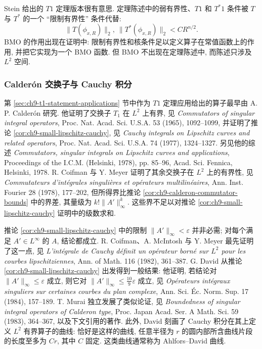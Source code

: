 \hypertarget{chapter-09-page-225}{}

Stein  给出的 $T1$ 定理版本很有意思. 定理陈述中的弱有界性、$T1$ 和 $T^*1$ 条件被 $T$ 与 $T^*$ 的一个 ``限制有界性'' 条件代替:
\[
 \|T(\phi_{x,R})\|_2,\ \|T^*(\phi_{x,R})\|_2<CR^{n/2}.
\]
BMO 的作用出现在证明中: 限制有界性和核条件足以定义算子在常值函数上的作用, 并把它实现为一个 BMO 函数. 但 BMO 不出现在定理陈述中, 而陈述只涉及 $L^2$ 空间.

\subsubsection{Calderón 交换子与 Cauchy 积分}
\label{subsec:ch9-calderon-cauchy}

第 \ref{sec:ch9-t1-statement-applications} 节中作为 $T1$ 定理应用给出的算子最早由 A. P. Calderón 研究. 他证明了交换子 $T_1$ 在 $L^2$ 上有界, 见 
\emph{Commutators of singular integral operators}, Proc. Nat. Acad. Sci. U.S.A. 53 (1965), 1092--1099, 并证明了推论 \ref{cor:ch9-small-lipschitz-cauchy}, 见 
\emph{Cauchy integrals on Lipschitz curves and related operators}, Proc. Nat. Acad. Sci. U.S.A. 74 (1977), 1324--1327. 另见他的综述 
\emph{Commutators, singular integrals on Lipschitz curves and applications}, Proceedings of the I.C.M. (Helsinki, 1978), pp. 85--96, Acad. Sci. Fennica, Helsinki, 1978. R. Coifman 与 Y. Meyer 证明了其余交换子在 $L^2$ 上的有界性, 见 
\emph{Commutateurs d'intégrales singulières et opérateurs multilinéaires}, Ann. Inst. Fourier 28 (1978), 177--202, 但所得界比推论 \ref{cor:ch9-calderon-commutator-bounds} 中的界差, 其量级为 $k!\|A'\|_\infty^k$. 这些界不足以对推论 \ref{cor:ch9-small-lipschitz-cauchy} 证明中的级数求和.

推论 \ref{cor:ch9-small-lipschitz-cauchy} 中的限制 $\|A'\|_\infty<\varepsilon$ 并非必需; 对每个满足 $A'\in L^\infty$ 的 $A$, 结论都成立. R. Coifman、A. McIntosh 与 Y. Meyer 最先证明了这一点, 见 
\emph{L'intégrale de Cauchy définit un opérateur borné sur $L^2$ pour les courbes lipschitziennes}, Ann. of Math. 116 (1982), 361--387. G. David 从推论 \ref{cor:ch9-small-lipschitz-cauchy} 出发得到一般结果: 他证明, 若结论对 $\|A'\|_\infty\leq\varepsilon$ 成立, 则它对 $\|A'\|_\infty\leq\frac{10}{9}\varepsilon$ 成立, 见 
\emph{Opérateurs intégraux singuliers sur certaines courbes du plan complexe}, Ann. Sci. Éc. Norm. Sup. 17 (1984), 157--189. T. Murai 独立发展了类似论证, 见 
\emph{Boundedness of singular integral operators of Calderon type}, Proc. Japan Acad. Ser. A Math. Sci. 59 (1983), 364--367, 以及下文引用的著作. 此外, David 刻画了 Cauchy 积分在其上定义 $L^2$ 有界算子的曲线: 恰好是这样的曲线, 任意半径为 $r$ 的圆内部所含曲线片段的长度至多为 $Cr$, 其中 $C$ 固定. 这类曲线通常称为 Ahlfors--David 曲线.

